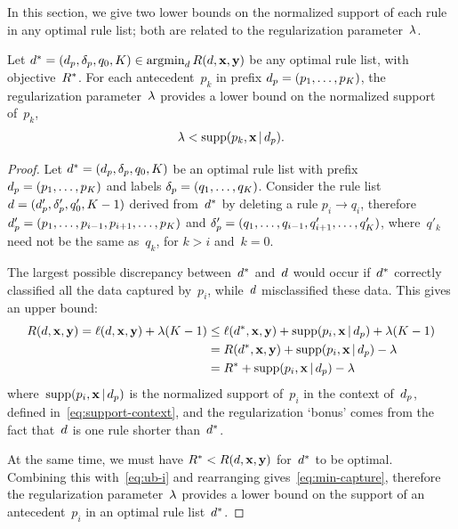 In this section, we give two lower bounds on the normalized support
of each rule in any optimal rule list;
both are related to the regularization parameter~${\lambda}$.

\begin{theorem}
\label{thm:min-capture}
Let ${d^* = (d_p, \delta_p, q_0, K) \in \operatorname*{argmin}_{d} R({d}, \mathbf{x}, \mathbf{y})}$
be any optimal rule list, with objective~$R^*$.
%
For each antecedent~$p_k$ in prefix ${d_p = (p_1, \dots, p_K)}$,
the regularization parameter~${\lambda}$ provides a lower bound
on the normalized support of~$p_k$,
\begin{align}
\Reg < \Supp(p_k, \x \given \Prefix).
\label{eq:min-capture}
\end{align}
\end{theorem}

\begin{proof}
Let ${d^* = (d_p, \delta_p, q_0, K)}$ be an optimal
rule list with prefix ${d_p = (p_1, \dots, p_K)}$
and labels ${\delta_p = (q_1, \dots, q_K)}$.
%
Consider the rule list ${{d} = (d_p', \delta_p', q_0', K-1)}$
derived from~$d^*$ by deleting a rule ${p_i \rightarrow q_i}$,
therefore ${d_p' = (p_1, \dots, p_{i-1}, p_{i+1}, \dots, p_K)}$
and ${\delta_p' = (q_1, \dots, q_{i-1}, q'_{i+1}, \dots, q'_K)}$,
where~$q'_k$ need not be the same as~$q_k$, for ${k > i}$ and~${k = 0}$.

The largest possible discrepancy between~$d^*$ and~${d}$ would occur
if~$d^*$ correctly classified all the data captured by~$p_i$,
while~${d}$ misclassified these data.
%
This gives an upper bound:
\begin{align}
\Obj(\RL, \x, \y) = \Loss(\RL, \x, \y) + \Reg (K - 1)
&\le \Loss(\OptimalRL, \x, \y) + \Supp(p_i, \x \given \Prefix) + \Reg(K - 1) \nn \\
&= \Obj(\OptimalRL, \x, \y) + \Supp(p_i, \x \given \Prefix) - \Reg \nn \\
&= \OptimalObj + \Supp(p_i, \x \given \Prefix) - \Reg
\label{eq:ub-i}
\end{align}
where~$\textnormal{supp}(p_i, \mathbf{x} \,|\, d_p)$ is the normalized support of~$p_i$
in the context of~$d_p$, defined in~\eqref{eq:support-context},
and the regularization `bonus' comes from the fact that~${d}$
is one rule shorter than~$d^*$.

At the same time, we must have ${R^* < R({d}, \mathbf{x}, \mathbf{y})}$ for~$d^*$ to be optimal.
%
Combining this with~\eqref{eq:ub-i} and rearranging gives~\eqref{eq:min-capture},
therefore the regularization parameter~${\lambda}$ provides a lower bound
on the support of an antecedent~$p_i$ in an optimal rule list~$d^*$.
\end{proof}

